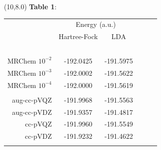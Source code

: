\documentclass[a0,draft,portrait]{a0poster}
\begin{document}
\begin{textblock}{7}(10,8.0)
\footnotesize
\textbf{Table 1}:
\begin{table}
    \normalsize
    \centering
    \begin{tabular}{|r|cc|cc|}
\hline                   &\multicolumn{2}{c|}{Energy (a.u.)}&            &               \\
                         &Hartree-Fock   &LDA            &               &               \\
\hline  \hspace{55mm}\   &\hspace{62mm}\ &\hspace{62mm}\ &\hspace{62mm}\ &\hspace{62mm}\ \\
	MRChem $10^{-2}$ & -192.0425     & -191.5975     &               &               \\
	MRChem $10^{-3}$ & -192.0002     & -191.5622     &               &               \\
	MRChem $10^{-4}$ & -192.0000     & -191.5619     &               &               \\
	                 &               &               &               &               \\
        aug-cc-pVQZ      & -191.9968     & -191.5563     &               &               \\
	aug-cc-pVDZ      & -191.9357     & -191.4817     &               &               \\
	    cc-pVQZ      & -191.9960     & -191.5549     &               &               \\
	    cc-pVDZ      & -191.9232     & -191.4622     &               &               \\
	                 &               &               &               &               \\
\hline
	\end{tabular}
    \end{table}
\end{textblock}
\end{document}
